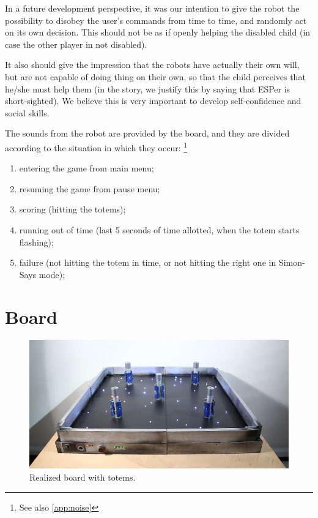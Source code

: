 \documentclass[a4paper,twoside]{book}
\begin{document}
In a future development perspective, it was our intention to give the robot the possibility to disobey the user's commands from time to time, and randomly act on its own decision. This should not be as if openly helping the disabled child (in case the other player in not disabled).

It also should give the impression that the robots have actually their own will, but are not capable of doing thing on their own, so that the child perceives that he/she must help them (in the story, we justify this by saying that ESPer is short-sighted). We believe this is very important to develop self-confidence and social skills.

The sounds from the robot are provided by the board, and they are divided according to the situation in which they occur:
\footnote{See also \autoref{app:noise}}

\begin{enumerate}
\item entering the game from main menu;
\item resuming the game from pause menu;
\item scoring (hitting the totems);
\item running out of time (last 5 seconds of time allotted, when the totem starts flashing);
\item failure (not hitting the totem in time, or not hitting the right one in Simon-Says mode);
\end{enumerate}


\section{Board}

\begin{figure}[h]
\includegraphics[width=\linewidth]{img/IMG_20160616_111353} 
\caption{Realized board with totems.}
\end{figure}
\end{document}
